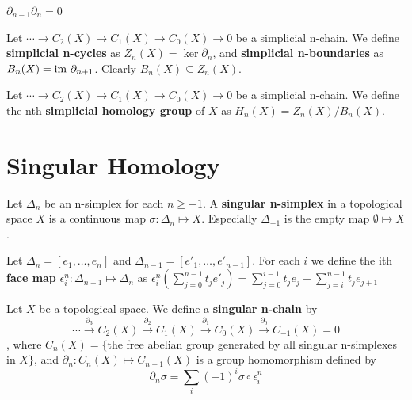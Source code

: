 \documentclass[12pt]{book}
\begin{document}
\begin{theorem}
	$\partial_{n-1}\partial_n=0$
\end{theorem}

\begin{definition}
	Let $\cdots\rightarrow C_2(X)\rightarrow C_1(X)\rightarrow C_0(X)\rightarrow 0$ be a simplicial n-chain. We define {\bf simplicial n-cycles} as $Z_n(X)=\ker \partial_n$, and {\bf simplicial n-boundaries} as $B_n(X)={\rm im\ } \partial_{n+1}$. Clearly $B_n(X)\subseteq Z_n(X)$.
\end{definition}

\begin{definition}
	Let $\cdots\rightarrow C_2(X)\rightarrow C_1(X)\rightarrow C_0(X)\rightarrow 0$ be a simplicial n-chain. We define the nth {\bf simplicial homology group} of $X$ as $H_n(X)=Z_n(X)/B_n(X)$.
\end{definition}

\section{Singular Homology}
\begin{definition}
	Let $\Delta_n$ be an n-simplex for each $n\geq-1$. A {\bf singular n-simplex} in a topological space $X$ is a continuous map $\sigma:\Delta_n\mapsto X$. Especially $\Delta_{-1}$ is the empty map $\emptyset\mapsto X$.
\end{definition}

\begin{definition}
	Let $\Delta_n=[e_1,\dots,e_n]$ and $\Delta_{n-1}=[e'_1,\dots,e'_{n-1}]$. For each $i$ we define the ith {\bf face map} $\epsilon^n_i:\Delta_{n-1}\mapsto\Delta_n$ as $\epsilon^n_i(\sum_{j=0}^{n-1} t_j e'_j)=\sum_{j=0}^{i-1} t_j e_j+\sum_{j=i}^{n-1} t_j e_{j+1}$
\end{definition}

\begin{definition}
	Let $X$ be a topological space. We define a {\bf singular n-chain} by
	\begin{equation}
		\cdots\overset{\partial_3}\longrightarrow C_2(X)\overset{\partial_2}\longrightarrow C_1(X)\overset{\partial_1}\longrightarrow C_0(X)\overset{\partial_0}\longrightarrow C_{-1}(X)=0
	\end{equation}
	, where $C_n(X)=\{$the free abelian group generated by all singular n-simplexes in $X\}$, and $\partial_n:C_n(X)\mapsto C_{n-1}(X)$ is a group homomorphism defined by
	\begin{equation}
		\partial_n \sigma=\sum_i(-1)^i \sigma\circ \epsilon^n_i
	\end{equation}
\end{definition}
\end{document}
